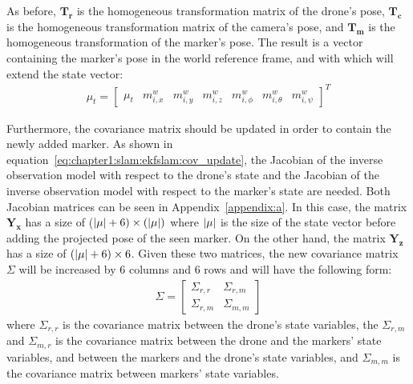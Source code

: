 As before, $\bm{T_r}$ is the homogeneous transformation matrix of the drone's pose, $\bm{T_c}$ is the homogeneous transformation matrix of the camera's pose, and $\bm{T_m}$ is the homogeneous transformation of the marker's pose. The result is a vector containing the marker's pose in the world reference frame, and with which will extend the state vector:
\begin{align*}
    \mu_t = \left[\begin{array}{c|cccccc}
        \mu_t & m_{i, x}^w & m_{i, y}^w & m_{i, z}^w & m_{i, \phi}^w & m_{i, \theta}^w & m_{i, \psi}^w
    \end{array}
    \right]^T
\end{align*}

Furthermore, the covariance matrix should be updated in order to contain the newly added marker. As shown in equation~\ref{eq:chapter1:slam:ekfslam:cov_update}, the Jacobian of the inverse observation model with respect to the drone's state and the Jacobian of the inverse observation model with respect to the marker's state are needed. Both Jacobian matrices can be seen in Appendix~\ref{appendix:a}. In this case, the matrix $\bm{Y_x}$ has a size of ($\lvert \mu \rvert+6) \times (\lvert \mu \rvert)$ where $\lvert \mu \rvert$ is the size of the state vector before adding the projected pose of the seen marker. On the other hand, the matrix $\bm{Y_z}$ has a size of $(\lvert \mu \rvert+6) \times 6$. Given these two matrices, the new covariance matrix $\Sigma$ will be increased by 6 columns and 6 rows and will have the following form:
\begin{align*}
    \Sigma = \begin{bmatrix}
        \Sigma_{r,r} & \Sigma_{r,m} \\ \Sigma_{r,m} & \Sigma_{m,m}
    \end{bmatrix}
\end{align*}
where $\Sigma_{r,r}$ is the covariance matrix between the drone's state variables, the $\Sigma_{r,m}$ and $\Sigma_{m,r}$ is the covariance matrix between the drone and the markers' state variables, and between the markers and the drone's state variables, and $\Sigma_{m,m}$ is the covariance matrix between markers' state variables.

